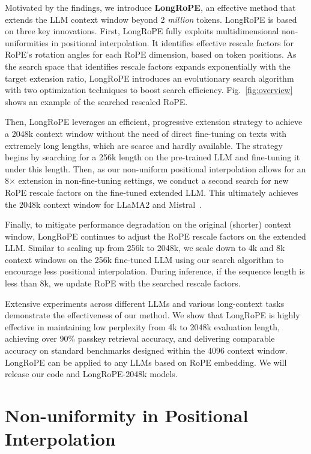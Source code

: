   Motivated by the findings, we introduce \textbf{LongRoPE},  an effective method that extends the LLM context window beyond 2 \emph{million} tokens.  LongRoPE is based on three key innovations. First, {LongRoPE} fully exploits multidimensional non-uniformities in positional interpolation. It identifies effective rescale factors for RoPE's rotation angles for each RoPE dimension, based on token positions. As the search space that identifies rescale factors expands exponentially with the target extension ratio, {LongRoPE} introduces an evolutionary search algorithm with two optimization techniques to boost search efficiency. Fig.~\ref{fig:overview} shows an example of the searched  rescaled RoPE.

 Then, {LongRoPE} leverages an efficient, progressive extension strategy to achieve a 2048k context window without the need of direct fine-tuning on texts with extremely long lengths, which are scarce and hardly available. The strategy begins by searching for a 256k length on the pre-trained LLM and fine-tuning it under this length. Then, as our non-uniform positional interpolation allows for an 8$\times$ extension in non-fine-tuning settings, we conduct a second search for new RoPE rescale factors on the fine-tuned extended LLM. This ultimately achieves the 2048k context window for LLaMA2 and Mistral~\cite{mistral}.

Finally, to mitigate performance degradation on the original (shorter) context window, {LongRoPE} continues to adjust the RoPE rescale factors on the extended LLM. Similar to scaling up from 256k to 2048k, we scale down to 4k and 8k context windows on the 256k fine-tuned LLM using our search algorithm to encourage less positional interpolation. During inference, if the sequence length is less than 8k, we update RoPE with the searched rescale factors. 

Extensive experiments across different LLMs and various long-context tasks demonstrate the effectiveness of our method. We show that LongRoPE is highly effective in maintaining low perplexity from 4k to 2048k evaluation length,  achieving over 90\% passkey retrieval accuracy, and delivering  comparable accuracy on standard benchmarks designed within the 4096 context window.  LongRoPE can be applied to any LLMs based on RoPE embedding. We will release our code and LongRoPE-2048k models.

\section{Non-uniformity in Positional Interpolation}
\label{sec:analysis}

